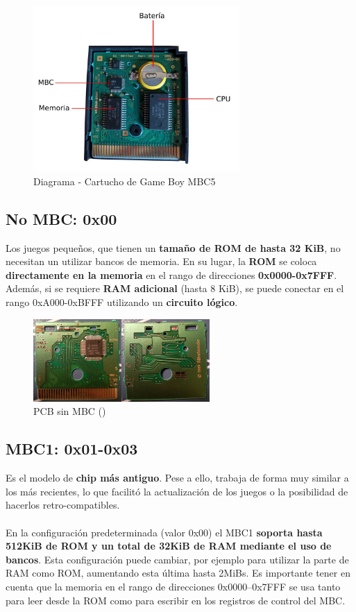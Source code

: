 \begin{figure}[H]
    \centering
    \includegraphics[width=0.7\textwidth]{include/images/cart.jpg}
    \caption{Diagrama - Cartucho de Game Boy MBC5}
    \label{figure:cart_gameboy}
\end{figure}

\subsection{No MBC: 0x00} Los juegos pequeños, que tienen un \textbf{tamaño de ROM de hasta 32 KiB}, no necesitan un utilizar bancos de memoria. En su lugar, la \textbf{ROM} se coloca \textbf{directamente en la memoria} en el rango de direcciones \textbf{0x0000-0x7FFF}. Además, si se requiere \textbf{RAM adicional} (hasta 8 KiB), se puede conectar en el rango 0xA000-0xBFFF utilizando un \textbf{circuito lógico}.

\begin{figure}[H]
    \centering
    \includegraphics[width=0.6\textwidth]{include/images/nombc.jpg}
    \caption{PCB sin MBC (\cite{hardwaredatabase})}
    \label{figure:cart_no_mbc}
\end{figure}

\subsection{MBC1: 0x01-0x03} Es el modelo de \textbf{chip más antiguo}. Pese a ello, trabaja de forma muy similar a los más recientes, lo que facilitó la actualización de los juegos o la posibilidad de hacerlos retro-compatibles.
\\\\
En la configuración predeterminada (valor 0x00) el MBC1 \textbf{soporta hasta 512KiB de ROM y un total de 32KiB de RAM mediante el uso de bancos}. Esta configuración puede cambiar, por ejemplo para utilizar la parte de RAM como ROM, aumentando esta última hasta 2MiBs. Es importante tener en cuenta que la memoria en el rango de direcciones 0x0000–0x7FFF se usa tanto para leer desde la ROM como para escribir en los registros de control del MBC.

